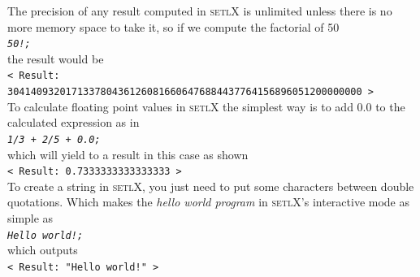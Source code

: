 \documentclass[11pt]{report}
\begin{document}
The precision of any result computed in \textsc{setlX} is unlimited unless there is no more memory space to take it, so if we compute the factorial of 50
\\[0.2cm]
\hspace*{1.3cm}
\texttt{\textsl{50!;}}
\\[0.2cm]
the result would be
\\[0.2cm]
\texttt{< Result: 3041409320171337804361260816606476884437764156896051200000000 >}
\\[0.2cm]
To calculate floating point values in \textsc{setlX} the simplest way is to add 0.0 to the calculated expression as in
\\[0.2cm]
\hspace*{1.3cm}
\texttt{\textsl{1/3 + 2/5 + 0.0;}}
\\[0.2cm]
which will yield to a result in this case as shown
\\[0.2cm]
\hspace*{1.3cm}
\texttt{< Result: 0.7333333333333333 >}
\\[0.2cm] 

To create a string in \textsc{setlX}, you just need to put some characters between double quotations. Which makes the \textsl{hello world program} in \textsc{setlX}'s interactive mode as simple as
\\[0.2cm]
\hspace*{1.3cm}
\texttt{\textsl{Hello world!;}}
\\[0.2cm]
which outputs 
\\[0.2cm]
\hspace*{1.3cm}
\texttt{< Result: "Hello world!" >}
\texttt{}
\\[0.2cm]
\end{document}
